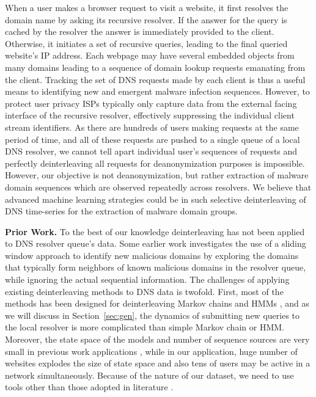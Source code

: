 	When a user makes a browser request to visit a website, it first
	resolves the domain name by asking its recursive resolver.  If the
	answer for the query is cached by the resolver the answer is
	immediately provided to the client. Otherwise, it initiates a set of
	recursive queries, leading to the final queried website's IP address.
	Each webpage may have several embedded objects from many domains
	leading to a sequence of domain lookup requests emanating from the
	client.  Tracking the set of DNS requests made by each client is thus
	a useful means to identifying new and emergent malware infection
	sequences.  However, to protect user privacy ISPs typically only
	capture data from the external facing interface of the recursive
	resolver, effectively suppressing the individual client stream
	identifiers.  As there are hundreds of users making requests at the
	same period of time, and all of these requests are pushed to a single
	queue of a local DNS resolver, we cannot tell apart individual user's
	sequences of requests and perfectly deinterleaving all requests for
	deanonymization purposes is impossible.  However, our objective is not
	deanonymization, but rather extraction of malware domain sequences
	which are observed repeatedly across resolvers.  We believe that advanced
	machine learning strategies could be  in such selective
	deinterleaving of DNS time-series for the extraction of malware
	domain groups.
	
	
	{\bf Prior Work. } To the best of our knowledge deinterleaving has not
	been applied to DNS resolver queue's data.  Some earlier
	work \cite{gao2013empirical} investigates the use of a sliding window
	approach to identify new malicious domains by exploring the domains
	that typically form neighbors of known malicious domains in the
	resolver queue, while ignoring the actual sequential information.  The
	challenges of applying existing deinterleaving methods to DNS data is
	twofold.  First, most of the methods has been designed for
	deinterleaving Markov chains \cite{batu2004inferring,
		seroussi2009deinterleaving, seroussi2012deinterleaving,
		minot2014separation} and HMMs \cite{landwehr2008modeling}, and as we
	will discuss in Section~\ref{sec:gen}, the dynamics of submitting new queries to
	the local resolver is more complicated than simple Markov chain or
	HMM.  Moreover, the state space of the models and number of sequence
	sources are very small in previous work
	applications \cite{minot2014separation, landwehr2008modeling}, while
	in our application, huge number of websites explodes the size of state
	space and also tens of users may be active in a network
	simultaneously.  Because of the nature of our dataset, we need to use
	tools other than those adopted in
	literature \cite{minot2014separation,
		landwehr2008modeling,burge1998finding, burge1997prediction}.
	
